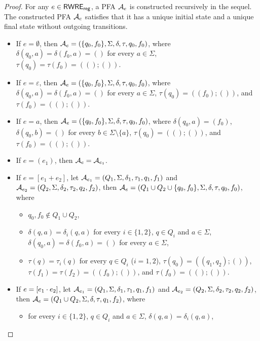 \begin{proof}
For any $e \in {\sf RWRE_{reg}}$, a PFA $\mathcal{A}_e$ is constructed recursively in the sequel. The constructed PFA $\mathcal{A}_e$ satisfies that it has a unique initial state and a unique final state  without outgoing transitions.
%
\begin{itemize}
\item If $e =\emptyset$, then $\mathcal{A}_e = (\{q_0,f_0\}, \Sigma, \delta, \tau, q_0, f_0)$, where $\delta(q_0, a) = \delta(f_0, a) = ()$ for every $a \in \Sigma$, $\tau(q_0) = \tau(f_0)= ((); ())$.

  \item If $e = \varepsilon$, then  $\mathcal{A}_e = (\{q_0, f_0\}, \Sigma, \delta, \tau, q_0, f_0)$, where  $\delta(q_0, a) = \delta(f_0, a) = ()$ for every $a \in \Sigma$, $\tau(q_0) = ((f_0); ())$, and $\tau(f_0) = ((); ())$. 

  \item If $e = a$, then $\mathcal{A}_e = (\{q_0, f_0\}, \Sigma, \delta, \tau, q_0, f_0)$, where  $\delta(q_0, a) = (f_0)$, $\delta(q_0, b) = ()$ for every $b \in \Sigma \setminus \{a\}$, $\tau(q_0) = ((); ())$, and $\tau(f_0) = ((); ())$.
    
  \item If $e = (e_1)$, then $\mathcal{A}_e = \mathcal{A}_{e_1}$.
  
  \item If $e = [e_1 + e_2]$, let $\mathcal{A}_{e_1} = (Q_1,
  \Sigma, \delta_1, \tau_1, q_1, f_1)$ and $\mathcal{A}_{e_2} = (Q_2, \Sigma,
  \delta_2, \tau_2, q_2, f_2)$, then $\mathcal{A}_e = (Q_1 \cup Q_2 \cup \{q_0, f_0\}, \Sigma,
  \delta, \tau, q_0, f_0)$, where  
  \begin{itemize}
 \item $q_0, f_0 \not \in Q_1 \cup Q_2$, 
 \item $\delta(q, a) = \delta_i(q, a)$ for every $i \in \{1,2\}$, $q \in Q_i$ and $a \in \Sigma$, 
$\delta(q_0, a) = \delta(f_0, a) = ()$ for every $a \in \Sigma$, 
%
 \item $\tau(q) = \tau_i(q)$ for every $q \in Q_i$ ($i =1,2$), $\tau(q_0) = ((q_1,q_2); ())$,  $\tau(f_1) = \tau(f_2) = ((f_0); ())$, and $\tau(f_0) = ((); ())$.
 \end{itemize}
%
  \item If $e = [e_1 \cdot e_2]$, let $\mathcal{A}_{e_1} = (Q_1,
  \Sigma, \delta_1, \tau_1, q_1, f_1)$ and $\mathcal{A}_{e_2} = (Q_2, \Sigma,
  \delta_2, \tau_2, q_2, f_2)$, then $\mathcal{A}_e = ( Q_1 \cup Q_2, \Sigma, \delta, \tau, q_1,
  f_2)$, where 
  \begin{itemize}
    \item for every $i \in \{1,2\}$, $q \in Q_i$ and $a \in \Sigma$, $\delta(q, a) = \delta_i(q, a)$,
    

\end{itemize}
\end{itemize}
\end{proof}
